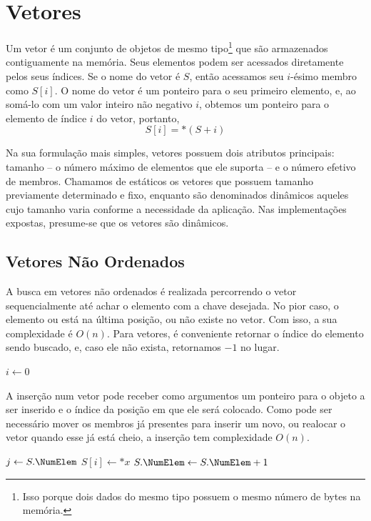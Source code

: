 \section{Vetores}

Um vetor é um conjunto de objetos de mesmo tipo\footnote{Isso porque dois dados do
mesmo tipo possuem o mesmo número de bytes na memória.} que são armazenados contiguamente na
memória.
Seus elementos podem ser acessados diretamente pelos seus índices.
Se o nome do vetor é $S$, então acessamos seu $i$-ésimo membro como $S[i]$.
O nome do vetor é um ponteiro para o seu primeiro elemento, e, ao somá-lo com um
valor inteiro não negativo $i$, obtemos um ponteiro para o elemento de índice $i$ do
vetor, portanto,
\[
    S[i] = *(S + i)
\]

Na sua formulação mais simples, vetores possuem dois atributos principais: tamanho --
o número máximo de elementos que ele suporta -- e o número efetivo de membros.
Chamamos de estáticos os vetores que possuem tamanho previamente determinado e fixo,
enquanto são denominados dinâmicos aqueles cujo tamanho varia conforme a necessidade
da aplicação.
Nas implementações expostas, presume-se que os vetores são dinâmicos.

\subsection{Vetores Não Ordenados}

A busca em vetores não ordenados é realizada percorrendo o vetor sequencialmente até
achar o elemento com a chave desejada.
No pior caso, o elemento ou está na última posição, ou não existe no vetor.
Com isso, a sua complexidade é $O(n)$.
Para vetores, é conveniente retornar o índice do elemento sendo buscado, e, caso ele
não exista, retornamos $-1$ no lugar.

\begin{function}[H]
\SetAlgoLined
\caption{Busca-Vetor($S$, $k$)}
$i \gets 0$\;
\;
\end{function}

A inserção num vetor pode receber como argumentos um ponteiro para o objeto a ser inserido
e o índice da posição em que ele será colocado.
Como pode ser necessário mover os membros já presentes para inserir um novo, ou realocar
o vetor quando esse já está cheio, a inserção tem complexidade $O(n)$.

\begin{function}[H]
\SetAlgoLined
\caption{Insere-Vetor($S$, $x$, $i$)}
$j \gets S.\NumElem$\;
$S[i] \gets *x$\;
$S.\NumElem \gets S.\NumElem + 1$\;
\end{function}

